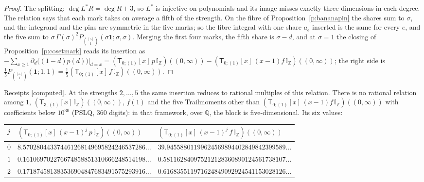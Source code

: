 \documentclass[11pt]{article}
\newcommand{\one}{\mathbf 1}
\newcommand{\sT}{\mathsf T}
\newcommand{\IZ}{\mathbb I_{\mathbb Z}}
\newcommand{\Tx}[3]{(\sT_{#1;(1)}[x]\,#2)((#3,\infty))}
\theoremstyle{plain}
\theoremstyle{definition}
\theoremstyle{remark}
\newcommand{\computed}{\textup{[computed]}}
\begin{document}
\begin{proof}
The splitting: $\deg L^\ast R=\deg R+3$, so $L^\ast$ is injective on polynomials and its image misses exactly three dimensions in each degree. The relation says that each mark takes on average a fifth of the strength. On the fibre of Proposition~\ref{p:bananapin} the shares sum to $\sigma$, and the integrand and the pins are symmetric in the five marks; so the fibre integral with one share $a_e$ inserted is the same for every $e$, and the five sum to $\sigma\,\Gamma(\sigma)^2P_{\binom{[5]}1}(\sigma\one;\sigma,\sigma)$. Merging the first four marks, the fifth share is $\sigma-d$, and at $\sigma=1$ the closing of Proposition~\ref{p:cosetmark} reads its insertion as $-\sum_{x\ge1}\partial_d\big((1-d)p(d)\big)\big|_{d=x}=\Tx{0}{p\,\IZ}{0}-\Tx{0}{(x-1)f\,\IZ}{0}$; the right side is $\frac15P_{\binom{[5]}1}(\one;1,1)=\frac15\Tx{0}{f\,\IZ}{0}$.
\end{proof}

\noindent Receipts \computed. At the strengths $2,\dots,5$ the same insertion reduces to rational multiples of this relation. There is no rational relation among $1$, $\Tx{3}{\IZ}{0}$, $f(1)$ and the five Trailmoments other than $\Tx{0}{(x-1)f\,\IZ}{0}$ with coefficients below $10^{30}$ (PSLQ, $360$ digits): in that framework, over $\mathbb Q$, the block is five-dimensional. Its six values:
\begin{center}
\small
\begin{tabular}{@{}lll@{}}
\toprule
$j$ & $\Tx{0}{(x-1)^j\,p\,\IZ}{0}$ & $\Tx{0}{(x-1)^j\,f\,\IZ}{0}$\\ \midrule
$0$ & $8.570280443374461268149695824246537286\ldots$ & $39.94558801199624569894402849842399589\ldots$\\
$1$ & $0.161069702276674858851310666248514198\ldots$ & $0.581162840975212128360890124561738107\ldots$\\
$2$ & $0.171874581383536904847683491575293916\ldots$ & $0.616835511971624849092924541153028126\ldots$\\
\bottomrule
\end{tabular}
\end{center}
\end{document}
